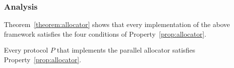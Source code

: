 \subsubsection{Analysis}
Theorem~\ref{theorem:allocator} shows that every implementation
of the above framework satisfies the four conditions of Property~\ref{prop:allocator}.

\begin{theorem}
\label{theorem:allocator}
Every protocol $P$ that implements the parallel allocator
satisfies Property~\ref{prop:allocator}.
\end{theorem}

